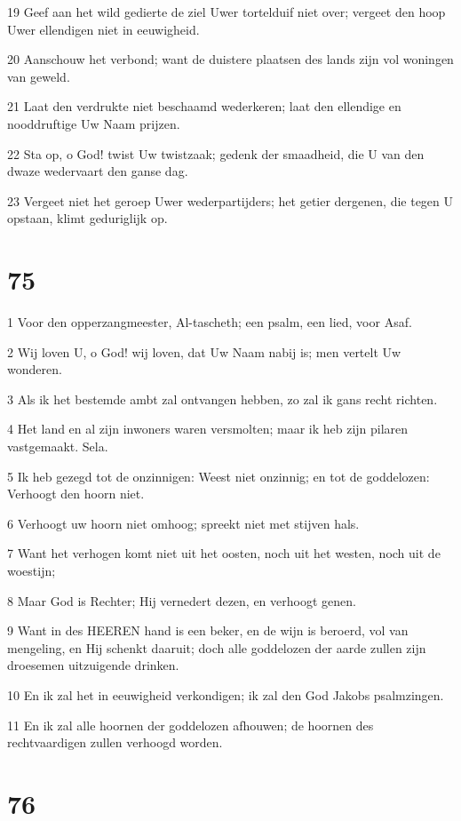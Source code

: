 \par 19 Geef aan het wild gedierte de ziel Uwer tortelduif niet over; vergeet den hoop Uwer ellendigen niet in eeuwigheid.
\par 20 Aanschouw het verbond; want de duistere plaatsen des lands zijn vol woningen van geweld.
\par 21 Laat den verdrukte niet beschaamd wederkeren; laat den ellendige en nooddruftige Uw Naam prijzen.
\par 22 Sta op, o God! twist Uw twistzaak; gedenk der smaadheid, die U van den dwaze wedervaart den ganse dag.
\par 23 Vergeet niet het geroep Uwer wederpartijders; het getier dergenen, die tegen U opstaan, klimt geduriglijk op.

\chapter{75}

\par 1 Voor den opperzangmeester, Al-tascheth; een psalm, een lied, voor Asaf.
\par 2 Wij loven U, o God! wij loven, dat Uw Naam nabij is; men vertelt Uw wonderen.
\par 3 Als ik het bestemde ambt zal ontvangen hebben, zo zal ik gans recht richten.
\par 4 Het land en al zijn inwoners waren versmolten; maar ik heb zijn pilaren vastgemaakt. Sela.
\par 5 Ik heb gezegd tot de onzinnigen: Weest niet onzinnig; en tot de goddelozen: Verhoogt den hoorn niet.
\par 6 Verhoogt uw hoorn niet omhoog; spreekt niet met stijven hals.
\par 7 Want het verhogen komt niet uit het oosten, noch uit het westen, noch uit de woestijn;
\par 8 Maar God is Rechter; Hij vernedert dezen, en verhoogt genen.
\par 9 Want in des HEEREN hand is een beker, en de wijn is beroerd, vol van mengeling, en Hij schenkt daaruit; doch alle goddelozen der aarde zullen zijn droesemen uitzuigende drinken.
\par 10 En ik zal het in eeuwigheid verkondigen; ik zal den God Jakobs psalmzingen.
\par 11 En ik zal alle hoornen der goddelozen afhouwen; de hoornen des rechtvaardigen zullen verhoogd worden.

\chapter{76}


